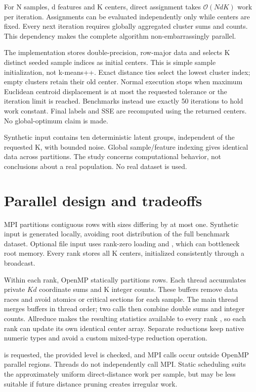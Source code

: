 \documentclass[conference,a4paper,10pt]{IEEEtran}
\begin{document}
For N samples, d features and K centers, direct assignment takes $\mathcal{O}(NdK)$ work per iteration. Assignments can be evaluated independently only while centers are fixed. Every next iteration requires globally aggregated cluster sums and counts. This dependency makes the complete algorithm non-embarrassingly parallel.

The implementation stores double-precision, row-major data and selects K distinct seeded sample indices as initial centers. This is simple sample initialization, not k-means++. Exact distance ties select the lowest cluster index; empty clusters retain their old center. Normal execution stops when maximum Euclidean centroid displacement is at most the requested tolerance or the iteration limit is reached. Benchmarks instead use exactly 50 iterations to hold work constant. Final labels and SSE are recomputed using the returned centers. No global-optimum claim is made.

Synthetic input contains ten deterministic latent groups, independent of the requested K, with bounded noise. Global sample/feature indexing gives identical data across partitions. The study concerns computational behavior, not conclusions about a real population. No real dataset is used.

\section{Parallel design and tradeoffs}

MPI partitions contiguous rows with sizes differing by at most one. Synthetic input is generated locally, avoiding root distribution of the full benchmark dataset. Optional file input uses rank-zero loading and , which can bottleneck root memory. Every rank stores all K centers, initialized consistently through a broadcast.

Within each rank, OpenMP statically partitions rows. Each thread accumulates private $Kd$ coordinate sums and K integer counts. These buffers remove data races and avoid atomics or critical sections for each sample. The main thread merges buffers in thread order; two  calls then combine double sums and integer counts. Allreduce makes the resulting statistics available to every rank \cite{allreduce}, so each rank can update its own identical center array. Separate reductions keep native numeric types and avoid a custom mixed-type reduction operation.

 is requested, the provided level is checked, and MPI calls occur outside OpenMP parallel regions. Threads do not independently call MPI. Static scheduling suits the approximately uniform direct-distance work per sample, but may be less suitable if future distance pruning creates irregular work.
\end{document}
